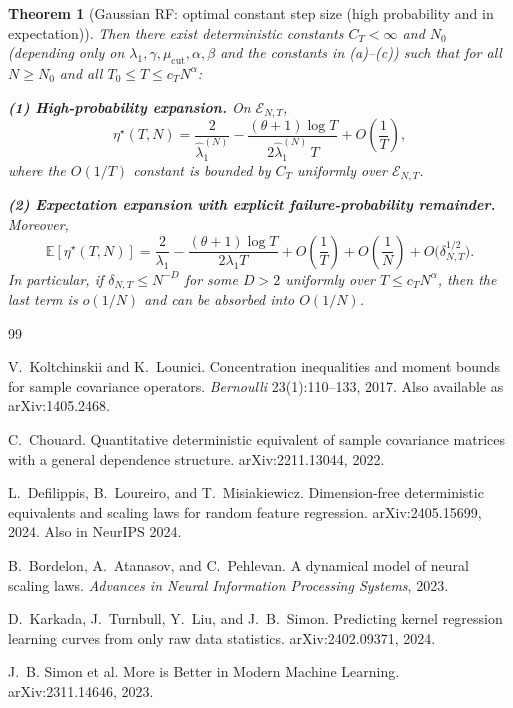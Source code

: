 \documentclass[11pt]{article}
\newtheorem{theorem}{Theorem}
\begin{document}
\begin{theorem}[Gaussian RF: optimal constant step size (high probability and in expectation)]
Then there exist deterministic constants $C_T<\infty$ and $N_0$ (depending only on
$\lambda_1,\gamma,\mu_{\mathrm{cut}},\alpha,\beta$ and the constants in (a)--(c)) such that
for all $N\ge N_0$ and all $T_0\le T\le c_TN^\alpha$:

\medskip
\noindent\textbf{(1) High-probability expansion.}
On $\mathcal E_{N,T}$,
\[
\eta^\star(T,N)
=
\frac{2}{\widehat\lambda_1^{(N)}}
-\frac{(\theta+1)\log T}{2\widehat\lambda_1^{(N)}\,T}
+O\!\left(\frac{1}{T}\right),
\]
where the $O(1/T)$ constant is bounded by $C_T$ uniformly over $\mathcal E_{N,T}$.

\medskip
\noindent\textbf{(2) Expectation expansion with explicit failure-probability remainder.}
Moreover,
\[
\mathbb E[\eta^\star(T,N)]
=
\frac{2}{\lambda_1}
-\frac{(\theta+1)\log T}{2\lambda_1 T}
+O\!\left(\frac{1}{T}\right)
+O\!\left(\frac{1}{N}\right)
+O\!\big(\delta_{N,T}^{1/2}\big).
\]
In particular, if $\delta_{N,T}\le N^{-D}$ for some $D>2$ uniformly over
$T\le c_TN^\alpha$, then the last term is $o(1/N)$ and can be absorbed into $O(1/N)$.
\end{theorem}


\begin{thebibliography}{99}

V.~Koltchinskii and K.~Lounici.
\newblock Concentration inequalities and moment bounds for sample covariance operators.
\newblock \emph{Bernoulli} 23(1):110--133, 2017. Also available as arXiv:1405.2468.

C.~Chouard.
\newblock Quantitative deterministic equivalent of sample covariance matrices with a general dependence structure.
\newblock arXiv:2211.13044, 2022.

L.~Defilippis, B.~Loureiro, and T.~Misiakiewicz.
\newblock Dimension-free deterministic equivalents and scaling laws for random feature regression.
\newblock arXiv:2405.15699, 2024. Also in NeurIPS 2024.

B.~Bordelon, A.~Atanasov, and C.~Pehlevan.
\newblock A dynamical model of neural scaling laws.
\newblock \emph{Advances in Neural Information Processing Systems}, 2023.

D.~Karkada, J.~Turnbull, Y.~Liu, and J.~B.~Simon.
\newblock Predicting kernel regression learning curves from only raw data statistics.
\newblock arXiv:2402.09371, 2024.

J.~B. Simon et al.
\newblock More is Better in Modern Machine Learning.
\newblock arXiv:2311.14646, 2023.

\end{thebibliography}
\end{document}

